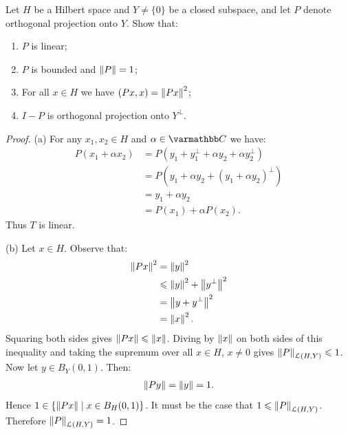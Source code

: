 \begin{exercise}\label{exercise:projection-norm-eq-1}
Let $H$ be a Hilbert space and $Y \neq \{0\}$ be a closed subspace, and let $P$ denote orthogonal projection onto $Y$. Show that:
    \begin{enumerate}[label = (\arabic*),itemsep=1pt,topsep=3pt]
        \item $P$ is linear;
        \item $P$ is bounded and $\left\lVert P \right\rVert = 1$;
        \item For all $x \in H$ we have $(Px,x) = \left\lVert Px \right\rVert^2$;
        \item $I - P$ is orthogonal projection onto $Y^\perp$.
    \end{enumerate}
\end{exercise}
\begin{proof}
    (a) For any $x_1,x_2 \in H$ and $\alpha \in \bfC$ we have:
        \begin{equation*}
        \begin{split}
            P(x_1 + \alpha x_2) 
            & = P(y_1 + y_1^\perp + \alpha y_2 + \alpha y_2^\perp) \\
            & = P(y_1 + \alpha y_2 + (y_1 + \alpha y_2)^\perp) \\
            & = y_1 + \alpha y_2 \\
            & = P(x_1) + \alpha P(x_2).
        \end{split}
        \end{equation*}
    Thus $T$ is linear.
    
    (b) Let $x \in H$. Observe that:
            \begin{equation*}
            \begin{split}
                \left\lVert Px \right\rVert^2 
                & = \left\lVert y \right\rVert^2 \\
                & \leqslant \left\lVert y \right\rVert^2 + \left\lVert y^\perp \right\rVert^2 \\
                & = \left\lVert y + y^\perp \right\rVert^2 \\
                & = \left\lVert x \right\rVert^2.
            \end{split}
            \end{equation*}
        Squaring both sides gives $\left\lVert Px \right\rVert \leqslant \left\lVert x \right\rVert$. Diving by $\left\lVert x \right\rVert$ on both sides of this inequality and taking the supremum over all $x \in H$, $x \neq 0$ gives $\left\lVert P \right\rVert_{\mathcal{L}(H,Y)} \leqslant 1$. Now let $y \in B_Y(0,1)$. Then:
            \begin{equation*}
            \begin{split}
                \left\lVert Py \right\rVert = \left\lVert y \right\rVert = 1.
            \end{split}
            \end{equation*}
        Hence $1 \in \{\left\lVert Px \right\rVert \mid x \in B_H(0,1)\}$. It must be the case that $1 \leqslant \left\lVert P \right\rVert_{\mathcal{L}(H,Y)}$. Therefore $\left\lVert P \right\rVert_{\mathcal{L}(H,Y)} = 1$.


\end{proof}
